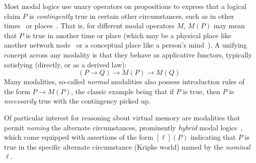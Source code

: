 Most modal logics use unary operators on propositions to express that a logical claim $P$ is \emph{contingently} true 
in certain other circumstances, such as in other times~\cite{pnueli1977temporal} or places~\cite{gordon2019modal}. That is, for 
different modal operators $M$, $M(P)$ may mean that $P$ is true in another time or place (which may be a physical place 
like another network node~\cite{murphy2008type,gordon2019modal} or a conceptual place like a person's 
mind~\cite{hintikka1962knowledge}). A unifying concept across any modality is that they behave as applicative functors, 
typically satisfying (directly, or as a derived law):
\[ (P\rightarrow Q) \rightarrow M(P) \rightarrow M(Q)\]
Many modalities, so-called \emph{normal} modalities also possess introduction rules of the form $P\rightarrow M(P)$, 
the classic example being that if $P$ is true, then $P$ is \emph{necessarily} true with the contingency picked up.%

Of particular interest for reasoning about virtual memory are modalities that permit \emph{naming} the alternate 
circumstances, prominently \emph{hybrid} modal logics~\cite{blackburn1995hybrid,areces2001hybrid}, which come equipped 
with assertions of the form $[\ell](P)$ indicating that $P$ is true in the specific alternate circumstance (Kripke world)
 named by the \emph{nominal} $\ell$.

